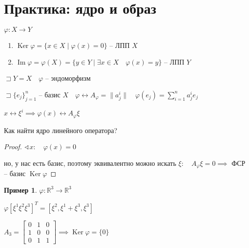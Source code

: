 \documentclass{book}
\newcommand\R{\ensuremath{\mathbb{R}}}
\DeclareMathOperator{\Image}{Im}
\DeclareMathOperator{\Ker}{Ker}
\theoremstyle{definition}
\newtheorem*{example}{Пример}
\begin{document}
\section{Практика: ядро и образ }

$\varphi: X\to Y$

 \begin{enumerate}
     \item $\Ker\varphi = \{x\in X\mid \varphi(x) = 0\}$ -- ЛПП $X$
     \item  $\Image \varphi = \varphi(X) = \{y\in Y\mid \exists x\in X\quad \varphi(x) = y\}$ -- ЛПП $Y$
\end{enumerate}

$\sqsupset Y = X\quad \varphi$ -- эндоморфизм

$\sqsupset \{e_j\}_{j=1}^n$ -- базис $X\quad \varphi \longleftrightarrow A_{\varphi} = \|a^i_j\|\quad \varphi\left( e_j \right)  = \sum_{i=1}^{n} a^i_je_j$ 

$x\longleftrightarrow \xi^i \implies \varphi(x) \longleftrightarrow A_{\varphi}\xi$

\begin{problem}
    Как найти ядро линейного оператора?
\end{problem}
\begin{proof}
    $\sphericalangle x:\quad \varphi(x) = 0$

    но, у нас есть базис, поэтому эквивалентно можно искать $\xi:\quad A_{\varphi}\xi = 0 \implies $ ФСР -- базис $\Ker\varphi$ 
\end{proof}

\begin{example}
    $\varphi: \R^3\to \R^3$

    $\varphi\left[ \xi^1\xi^2\xi^3 \right] ^T = \left[ \xi^2,\xi^1+\xi^3,\xi^3 \right] $

    $A_3 = \begin{bmatrix} 0&1&0\\1&0&0\\0&1&1 \end{bmatrix}  \implies  \Ker \varphi = \{0\}$
\end{example}
\end{document}
